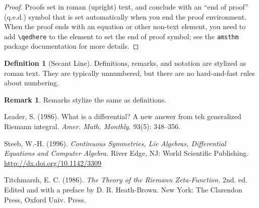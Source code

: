 \documentclass{article}
\theoremstyle{theorem}
\theoremstyle{definition}
\newtheorem*{definition}{Definition}
\newtheorem*{remark}{Remark}
\begin{document}
    \begin{proof}
        Proofs set in roman (upright) text, and conclude with an ``end of proof'' (q.e.d.) symbol that is set automatically when you end the proof environment.  When the proof ends with an equation or other non-text element, you need to add \verb~\qedhere~ to the element to set the end of proof symbol; see the \texttt{amsthm} package documentation for more details.
    \end{proof}

    \begin{definition}[Secant Line]
        Definitions, remarks, and notation are stylized as roman text.  They are typically unnumbered, but there are no hard-and-fast rules about numbering.
    \end{definition}

    \begin{remark}
        Remarks stylize the same as definitions.
    \end{remark}

    \begin{thebibliography}{3}

        Leader, S. (1986). What is a differential? A new answer from teh generalized Riemann integral. {\it Amer. Math. Monthly.\/} 93(5): 348--356.

        Steeb, W.-H. (1996). \textit{Continuous Symmetries, Lie Algebras, Differential Equations and Computer Algebra.\/} River Edge, NJ: World Scientific Publishing.  \href{http://dx.doi.org/10.1142/3309}{\url{http://dx.doi.org/10.1142/3309}}

        Titchmarsh, E. C. (1986). {\it The Theory of the Riemann Zeta-Function.\/} 2nd. ed. Edited and with a preface by D. R. Heath-Brown. New York: The Clarendon Press, Oxford Univ. Press.

    \end{thebibliography}
\end{document}
